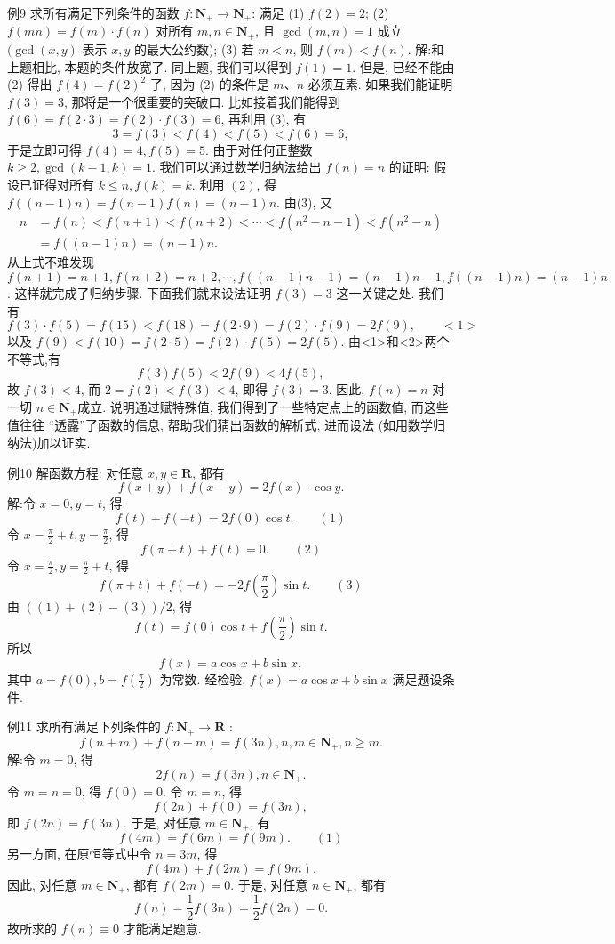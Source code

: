 例9 求所有满足下列条件的函数 $f: \mathbf{N}_{+} \rightarrow \mathbf{N}_{+}$: 满足
(1) $f(2)=2$;
(2) $f(m n)=f(m) \cdot f(n)$ 对所有 $m, n \in \mathbf{N}_{+}$, 且 $\operatorname{gcd}(m, n)=1$ 成立 $(\operatorname{gcd}(x, y)$ 表示 $x, y$ 的最大公约数);
(3) 若 $m<n$, 则 $f(m)<f(n)$.
解:和上题相比, 本题的条件放宽了.
同上题, 我们可以得到 $f(1)=1$. 但是, 已经不能由 (2) 得出 $f(4)=f(2)^2$ 了, 因为 (2) 的条件是 $m 、 n$ 必须互素.
如果我们能证明 $f(3)=3$, 那将是一个很重要的突破口.
比如接着我们能得到 $f(6)=f(2 \cdot 3)=f(2) \cdot f(3)=6$, 再利用 (3), 有
$$
3=f(3)<f(4)<f(5)<f(6)=6,
$$
于是立即可得 $f(4)=4, f(5)=5$.
由于对任何正整数 $k \geqslant 2, \operatorname{gcd}(k-1, k)=1$. 我们可以通过数学归纳法给出 $f(n)=n$ 的证明:
假设已证得对所有 $k \leqslant n, f(k)=k$.
利用 $(2)$, 得 $f((n-1) n)=f(n-1) f(n)=(n-1) n$.
由(3), 又
$$
\begin{aligned}
n & =f(n)<f(n+1)<f(n+2)<\cdots<f\left(n^2-n-1\right)<f\left(n^2-n\right) \\
& =f((n-1) n)=(n-1) n .
\end{aligned}
$$
从上式不难发现 $f(n+1)=n+1, f(n+2)=n+2, \cdots, f((n-1) n- 1) =(n-1) n-1, f((n-1) n)=(n-1) n$.
这样就完成了归纳步骤.
下面我们就来设法证明 $f(3)=3$ 这一关键之处.
我们有
$$
f(3) \cdot f(5)=f(15)<f(18)=f(2 \cdot 9)=f(2) \cdot f(9)=2 f(9), \quad\quad <1>
$$
以及 $f(9)<f(10)=f(2 \cdot 5)=f(2) \cdot f(5)=2 f(5)$.\quad{}
由<1>和<2>两个不等式,有
$$
f(3) f(5)<2 f(9)<4 f(5),
$$
故 $f(3)<4$, 而 $2=f(2)<f(3)<4$, 即得 $f(3)=3$.
因此, $f(n)=n$ 对一切 $n \in \mathbf{N}_{+}$成立.
说明通过赋特殊值, 我们得到了一些特定点上的函数值, 而这些值往往 “透露”了函数的信息, 帮助我们猜出函数的解析式, 进而设法 (如用数学归纳法)加以证实.



例10 解函数方程: 对任意 $x, y \in \mathbf{R}$, 都有
$$
f(x+y)+f(x-y)=2 f(x) \cdot \cos y .
$$
解:令 $x=0, y=t$, 得
$$
f(t)+f(-t)=2 f(0) \cos t . \quad\quad (1)
$$
令 $x=\frac{\pi}{2}+t, y=\frac{\pi}{2}$, 得
$$
f(\pi+t)+f(t)=0 .\quad\quad (2)
$$
令 $x=\frac{\pi}{2}, y=\frac{\pi}{2}+t$, 得
$$
f(\pi+t)+f(-t)=-2 f\left(\frac{\pi}{2}\right) \sin t .\quad\quad (3)
$$
由 $((1) +(2)-(3)) / 2$, 得
$$
f(t)=f(0) \cos t+f\left(\frac{\pi}{2}\right) \sin t .
$$
所以
$$
f(x)=a \cos x+b \sin x,
$$
其中 $a=f(0), b=f\left(\frac{\pi}{2}\right)$ 为常数.
经检验, $f(x)=a \cos x+b \sin x$ 满足题设条件.



例11 求所有满足下列条件的 $f: \mathbf{N}_{+} \rightarrow \mathbf{R}$ :
$$
f(n+m)+f(n-m)=f(3 n), n, m \in \mathbf{N}_{+}, n \geqslant m .
$$
解:令 $m=0$, 得
$$
2 f(n)=f(3 n), n \in \mathbf{N}_{+} .
$$
令 $m=n=0$, 得 $f(0)=0$.
令 $m=n$, 得
$$
f(2 n)+f(0)=f(3 n),
$$
即 $f(2 n)=f(3 n)$.
于是, 对任意 $m \in \mathbf{N}_{+}$, 有
$$
f(4 m)=f(6 m)=f(9 m) . \quad\quad (1)
$$
另一方面, 在原恒等式中令 $n=3 m$, 得
$$
f(4 m)+f(2 m)=f(9 m) .
$$
因此, 对任意 $m \in \mathbf{N}_{+}$, 都有 $f(2 m)=0$. 于是, 对任意 $n \in \mathbf{N}_{+}$, 都有
$$
f(n)=\frac{1}{2} f(3 n)=\frac{1}{2} f(2 n)=0 .
$$
故所求的 $f(n) \equiv 0$ 才能满足题意.



